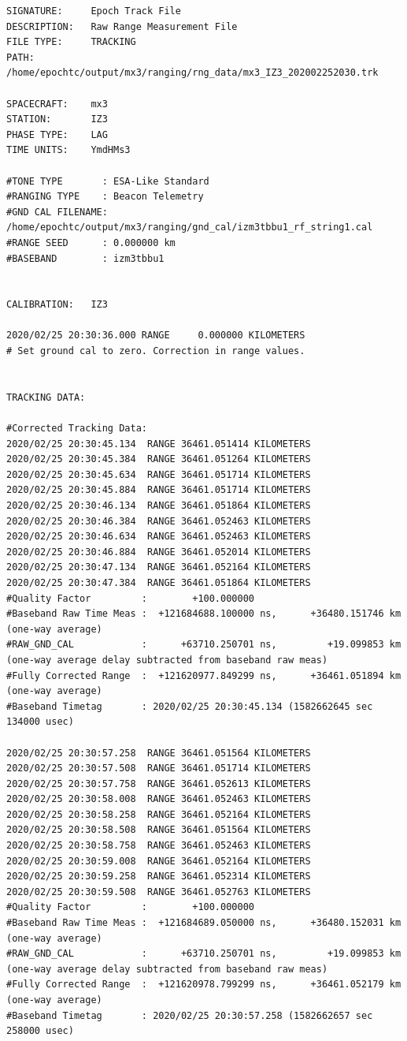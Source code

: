 \documentclass[11pt]{article}
\begin{document}
    \begin{verbatim}
SIGNATURE:     Epoch Track File
DESCRIPTION:   Raw Range Measurement File
FILE TYPE:     TRACKING
PATH:          /home/epochtc/output/mx3/ranging/rng_data/mx3_IZ3_202002252030.trk

SPACECRAFT:    mx3
STATION:       IZ3
PHASE TYPE:    LAG
TIME UNITS:    YmdHMs3

#TONE TYPE       : ESA-Like Standard
#RANGING TYPE    : Beacon Telemetry
#GND CAL FILENAME: /home/epochtc/output/mx3/ranging/gnd_cal/izm3tbbu1_rf_string1.cal
#RANGE SEED      : 0.000000 km
#BASEBAND        : izm3tbbu1


CALIBRATION:   IZ3

2020/02/25 20:30:36.000 RANGE     0.000000 KILOMETERS
# Set ground cal to zero. Correction in range values.


TRACKING DATA:

#Corrected Tracking Data:
2020/02/25 20:30:45.134  RANGE 36461.051414 KILOMETERS
2020/02/25 20:30:45.384  RANGE 36461.051264 KILOMETERS
2020/02/25 20:30:45.634  RANGE 36461.051714 KILOMETERS
2020/02/25 20:30:45.884  RANGE 36461.051714 KILOMETERS
2020/02/25 20:30:46.134  RANGE 36461.051864 KILOMETERS
2020/02/25 20:30:46.384  RANGE 36461.052463 KILOMETERS
2020/02/25 20:30:46.634  RANGE 36461.052463 KILOMETERS
2020/02/25 20:30:46.884  RANGE 36461.052014 KILOMETERS
2020/02/25 20:30:47.134  RANGE 36461.052164 KILOMETERS
2020/02/25 20:30:47.384  RANGE 36461.051864 KILOMETERS
#Quality Factor         :        +100.000000
#Baseband Raw Time Meas :  +121684688.100000 ns,      +36480.151746 km (one-way average)
#RAW_GND_CAL            :      +63710.250701 ns,         +19.099853 km (one-way average delay subtracted from baseband raw meas)
#Fully Corrected Range  :  +121620977.849299 ns,      +36461.051894 km (one-way average)
#Baseband Timetag       : 2020/02/25 20:30:45.134 (1582662645 sec 134000 usec)

2020/02/25 20:30:57.258  RANGE 36461.051564 KILOMETERS
2020/02/25 20:30:57.508  RANGE 36461.051714 KILOMETERS
2020/02/25 20:30:57.758  RANGE 36461.052613 KILOMETERS
2020/02/25 20:30:58.008  RANGE 36461.052463 KILOMETERS
2020/02/25 20:30:58.258  RANGE 36461.052164 KILOMETERS
2020/02/25 20:30:58.508  RANGE 36461.051564 KILOMETERS
2020/02/25 20:30:58.758  RANGE 36461.052463 KILOMETERS
2020/02/25 20:30:59.008  RANGE 36461.052164 KILOMETERS
2020/02/25 20:30:59.258  RANGE 36461.052314 KILOMETERS
2020/02/25 20:30:59.508  RANGE 36461.052763 KILOMETERS
#Quality Factor         :        +100.000000
#Baseband Raw Time Meas :  +121684689.050000 ns,      +36480.152031 km (one-way average)
#RAW_GND_CAL            :      +63710.250701 ns,         +19.099853 km (one-way average delay subtracted from baseband raw meas)
#Fully Corrected Range  :  +121620978.799299 ns,      +36461.052179 km (one-way average)
#Baseband Timetag       : 2020/02/25 20:30:57.258 (1582662657 sec 258000 usec)
\end{verbatim}
\end{document}
